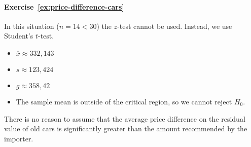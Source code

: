 \paragraph{Exercise~\ref{ex:price-difference-cars}}

In this situation ($n = 14 < 30$) the $z$-test cannot be used. Instead, we use Student's $t$-test.

\begin{itemize}
  \item $\overline{x} \approx 332,143$
  \item $s \approx 123,424$
  \item $g \approx 358,42$
  \item The sample mean is outside of the critical region, so we cannot reject $H_0$.
\end{itemize}

There is no reason to assume that the average price difference on the residual value of old cars is significantly greater than the amount recommended by the importer.
